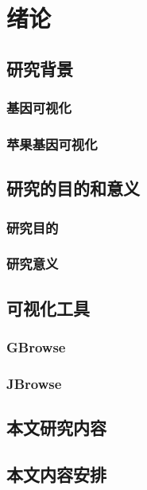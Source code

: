 \chapter{绪论}
	\section{研究背景}
		\subsection{基因可视化}
		\subsection{苹果基因可视化}
	\section{研究的目的和意义}
		\subsection{研究目的}
		\subsection{研究意义}
	\section{可视化工具}
		\subsection{GBrowse}
		\subsection{JBrowse}
	\section{本文研究内容}
	\section{本文内容安排}
	